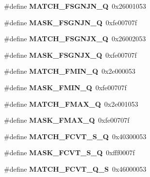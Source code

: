 \begin{DoxyCompactItemize}
\#define {\bfseries M\+A\+T\+C\+H\+\_\+\+F\+S\+G\+N\+J\+N\+\_\+Q}~0x26001053
\item 
\mbox{\label{riscv-utility_8h_a1004568af929c77700221a24166e0fb1}} 
\#define {\bfseries M\+A\+S\+K\+\_\+\+F\+S\+G\+N\+J\+N\+\_\+Q}~0xfe00707f
\item 
\mbox{\label{riscv-utility_8h_ab6a3468279583409b82e555863dbf990}} 
\#define {\bfseries M\+A\+T\+C\+H\+\_\+\+F\+S\+G\+N\+J\+X\+\_\+Q}~0x26002053
\item 
\mbox{\label{riscv-utility_8h_aba901b52e2ed24a9eea427112edc7160}} 
\#define {\bfseries M\+A\+S\+K\+\_\+\+F\+S\+G\+N\+J\+X\+\_\+Q}~0xfe00707f
\item 
\mbox{\label{riscv-utility_8h_a0f13eda91f926add93931319fce4c36b}} 
\#define {\bfseries M\+A\+T\+C\+H\+\_\+\+F\+M\+I\+N\+\_\+Q}~0x2e000053
\item 
\mbox{\label{riscv-utility_8h_aa0f7ddf89e9464d90839c01d09ff6fa6}} 
\#define {\bfseries M\+A\+S\+K\+\_\+\+F\+M\+I\+N\+\_\+Q}~0xfe00707f
\item 
\mbox{\label{riscv-utility_8h_a583be37b49ab8ef7fd164eaabc870f3b}} 
\#define {\bfseries M\+A\+T\+C\+H\+\_\+\+F\+M\+A\+X\+\_\+Q}~0x2e001053
\item 
\mbox{\label{riscv-utility_8h_a307b8d68843398d86ca0fe86634eb069}} 
\#define {\bfseries M\+A\+S\+K\+\_\+\+F\+M\+A\+X\+\_\+Q}~0xfe00707f
\item 
\mbox{\label{riscv-utility_8h_aece0105064482c2f7cc44980ab1a60e6}} 
\#define {\bfseries M\+A\+T\+C\+H\+\_\+\+F\+C\+V\+T\+\_\+\+S\+\_\+Q}~0x40300053
\item 
\mbox{\label{riscv-utility_8h_ae48f419dd6e9c3e571f250cfb1a833e0}} 
\#define {\bfseries M\+A\+S\+K\+\_\+\+F\+C\+V\+T\+\_\+\+S\+\_\+Q}~0xfff0007f
\item 
\mbox{\label{riscv-utility_8h_a3661d9f7af8dfe2cc546ecab35cda599}} 
\#define {\bfseries M\+A\+T\+C\+H\+\_\+\+F\+C\+V\+T\+\_\+\+Q\+\_\+S}~0x46000053
\item 

\end{DoxyCompactItemize}
